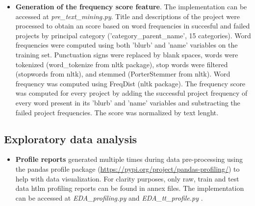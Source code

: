 \documentclass{article}
\begin{document}
{\begin{itemize}
    Before splitting the data in train and test sets, I visualized the projects by year ("state\_changed\_at") and state (FIG). The implementation can be accessed at \emph{pre\_year\_EDA.py} and \emph{pre\_data\_prep\_temporal\_and\_classification.py}. The target variable ( state) shows no clear correlation with time, as we can observe in the plots (FIG) and our data are not evenly spaced. Therefore, after close examination of our data, I decided to implement a random split of train and test sets using the train\_test\_split functiikit learn model\_selection package, a train size of 73 \% a 37 as random seed. Before spliting, 15 columns were dropped, containing information not available prior to the project's state change. Dimensions of training set are 89490 rows and 97 columns, and dimensions of test set are 33100 rows and 97 columns. 
    FIG 

	
    \item \textbf{Generation of the frequency score feature}.
    The implementation can be accessed at \emph{pre\_text\_mining.py}.
    Title and descriptions of the project were processed to obtain an score based on word frequencies in succesful and failed projects by principal category ('category\_parent\_name', 15 categories). Word  frequencies were computed using both 'blurb' and 'name' variables on the training set. Punctuation signs were replaced by blank spaces, words were tokenized (word\_tokenize from nltk package), stop words were filtered (stopwords from nltk), and stemmed (PorterStemmer from nltk). Word frequency was computed using FreqDist (nltk package). The frequency score was computed for every project by adding the successful project frequency of every word present in its 'blurb' and 'name' variables and substracting the failed project frequencies. The score was normalized by text lenght.  

\end{itemize}

\subsection{Exploratory data analysis}
\label{subsec:EDA}
\begin{itemize}

\item \textbf{Profile reports} generated multiple times during data pre-processing using the pandas profile package (\url{https://pypi.org/project/pandas-profiling/}) to help with data visualization. For clarity purposes, only raw, train and test data htlm profiling reports can be found in annex files.
The implementation can be accessed at \emph{EDA\_profiling.py} and \emph{EDA\_tt\_profile.py }.


\end{itemize}}
\end{document}
